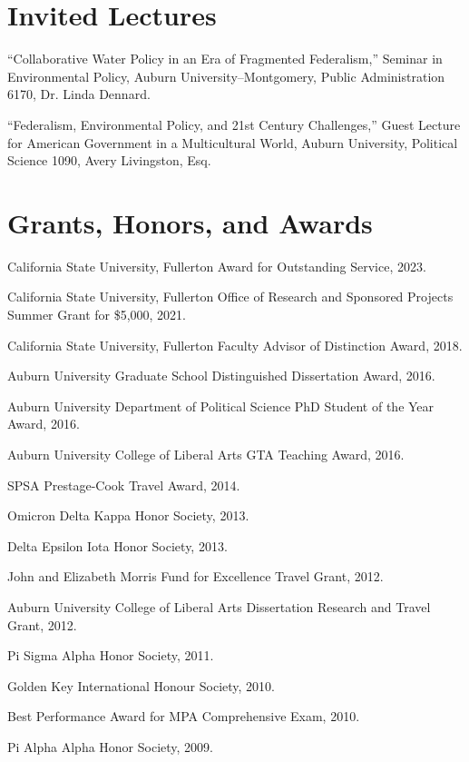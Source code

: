 \documentclass[12pt,letterpaper]{article}
\renewenvironment{itemize}{
  \begin{list}{}{
    \setlength{\leftmargin}{1.5em}
    \setlength{\itemsep}{0.25em}
    \setlength{\parskip}{0pt}
    \setlength{\parsep}{0.25em}
  }
}{
  \end{list}
}
\begin{document}
\section*{Invited Lectures}
\begin{itemize}\leftmargin=2pt\itemindent=-15pt\leftmargin=2pt\itemindent=-15pt
	\item ``Collaborative Water Policy in an Era of Fragmented Federalism,'' Seminar in Environmental Policy, Auburn University--Montgomery, Public Administration 6170, Dr. Linda Dennard.
	
	\item ``Federalism, Environmental Policy, and 21st Century Challenges,'' Guest Lecture for American Government in a Multicultural World, Auburn University, Political Science 1090, Avery Livingston, Esq. 
	
\end{itemize}

\section*{Grants, Honors, and Awards}
\begin{itemize}\leftmargin=2pt\itemindent=-15pt
  \item California State University, Fullerton Award for Outstanding Service, 2023.
	\item California State University, Fullerton Office of Research and Sponsored Projects Summer Grant for \$5,000, 2021.
	\item California State University, Fullerton Faculty Advisor of Distinction Award, 2018.
	\item Auburn University Graduate School Distinguished Dissertation Award, 2016.
	\item Auburn University Department of Political Science PhD Student of the Year Award, 2016.
	\item Auburn University College of Liberal Arts GTA Teaching Award, 2016.
	\item SPSA Prestage-Cook Travel Award, 2014.
	\item Omicron Delta Kappa Honor Society, 2013.
	\item Delta Epsilon Iota Honor Society, 2013.
	\item John and Elizabeth Morris Fund for Excellence Travel Grant, 2012.
	\item Auburn University College of Liberal Arts Dissertation Research and Travel Grant, 2012.
	\item Pi Sigma Alpha Honor Society, 2011.
	\item Golden Key International Honour Society, 2010.
	\item Best Performance Award for MPA Comprehensive Exam, 2010.
	\item Pi Alpha Alpha Honor Society, 2009.
\end{itemize}
\end{document}
